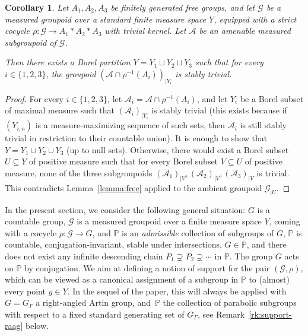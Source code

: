 \documentclass[JEP,XML,SOM,Unicode,NoFloatCountersInSection,published]{cedram}
\let\mathcal\mathscr
\theoremstyle{plain}
\newtheorem{cor}[theo]{Corollary}
\theoremstyle{definition}
\let\dunion\sqcup
\newcommand{\cala}{\mathcal{A}}
\newcommand{\calg}{\mathcal{G}}
\begin{document}
\begin{cor}\label{cor:free-2}
Let $A_1,A_2,A_3$ be finitely generated free groups, and let $\calg$ be a measured groupoid over a standard finite measure space $Y$, equipped with a strict cocycle $\rho:\calg\to A_1\ast A_2\ast A_3$ with trivial kernel. Let $\cala$ be an amenable measured subgroupoid of $\calg$.

Then there exists a Borel partition $Y=Y_1\dunion Y_2\dunion Y_3$ such that for every $i\in\{1,2,3\}$, the groupoid $(\cala\cap\rho^{-1}(A_i))_{|Y_i}$ is stably trivial.
\end{cor}

\begin{proof}
For every $i\in\{1,2,3\}$, let $\cala_i=\cala\cap\rho^{-1}(A_i)$, and let $Y_i$ be a Borel subset of maximal measure such that $(\cala_i)_{|Y_i}$ is stably trivial (this exists because if $(Y_{i,n})$ is a measure-maximizing sequence of such sets, then $\cala_i$ is still stably trivial in restriction to their countable union). It is enough to show that $Y=Y_1\cup Y_2\cup Y_3$ (up to null sets). Otherwise, there would exist a Borel subset $U\subseteq Y$ of positive measure such that for every Borel subset $V\subseteq U$ of positive measure, none of the three subgroupoids $(\cala_1)_{|V},(\cala_2)_{|V},(\cala_3)_{|V}$ is trivial. This contradicts Lemma~\ref{lemma:free} applied to the ambient groupoid $\calg_{|U}$.
\end{proof}


In the present section, we consider the following general situation: $G$ is a countable group, $\calg$ is a measured groupoid over a finite measure space $Y$, coming with a cocycle $\rho:\calg\to G$, and $\mathbb{P}$ is an \emph{admissible} collection of subgroups of $G$, \ie $\mathbb{P}$ is countable, conjugation-invariant, stable under intersections, $G\in \mathbb {P}$, and there does not exist any infinite descending chain $P_1\supsetneq P_2\supsetneq\cdots$ in $\mathbb{P}$. The group $G$ acts on $\mathbb{P}$ by conjugation. We aim at defining a notion of support for the pair $(\calg,\rho)$, which can be viewed as a canonical assignment of a subgroup in $\mathbb{P}$ to (almost) every point $y\in Y$. In the sequel of the paper, this will always be applied with $G=G_\Gamma$ a right-angled Artin group, and~$\mathbb{P}$ the collection of parabolic subgroups with respect to a fixed standard generating set of $G_\Gamma$, see Remark~\ref{rk:support-raag} below.
\end{document}
